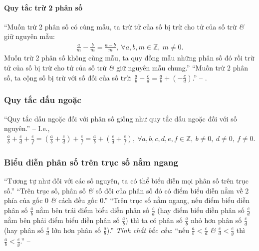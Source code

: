 \documentclass{article}
\numberwithin{equation}{section}
\begin{document}
\paragraph{Quy tắc trừ 2 phân số}
``Muốn trừ 2 phân số có cùng mẫu, ta trừ tử của số bị trừ cho tử của số trừ \textit{\&} giữ nguyên mẫu:
\begin{align*}
	\frac{a}{m} - \frac{b}{m} = \frac{a - b}{m},\ \forall a,b,m\in\mathbb{Z},\ m\ne 0.
\end{align*}
Muốn trừ 2 phân số không cùng mẫu, ta quy đồng mẫu những phân số đó rồi trừ tử của số bị trừ cho tử của số trừ \textit{\&} giữ nguyên mẫu chung.'' ``Muốn trừ 2 phân số, ta cộng số bị trừ với số đối của số trừ: $\frac{a}{b} - \frac{c}{d} = \frac{a}{b} + \left(-\frac{c}{d}\right)$.'' -- \cite[pp. 36--37]{SGK_Toan_6_Canh_Dieu_tap_2}.

\subsubsection{Quy tắc dấu ngoặc}
``Quy tắc dấu ngoặc đối với phân số giống như quy tắc dấu ngoặc đối với số nguyên.'' -- \cite[p. 37]{SGK_Toan_6_Canh_Dieu_tap_2} I.e.,
\begin{align*}
	\frac{a}{b} + \frac{c}{d} + \frac{e}{f} = \left(\frac{a}{b} + \frac{c}{d}\right) + \frac{e}{f} = \frac{a}{b} + \left(\frac{c}{d} + \frac{e}{f}\right),\ \forall a,b,c,d,e,f\in\mathbb{Z},\ b\ne 0,\ d\ne 0,\ f\ne 0.
\end{align*}

\subsubsection{Biểu diễn phân số trên trục số nằm ngang}
``Tương tự như đối với các số nguyên, ta có thể biểu diễn mọi phân số trên trục số.'' ``Trên trục số, phân số \textit{\&} số đối của phân số đó có điểm biểu diễn nằm về 2 phía của gốc 0 \textit{\&} cách đều gốc 0.'' ``Trên trục số nằm ngang, nếu điểm biểu diễn phân số $\frac{a}{b}$ nằm bên trái điểm biểu diễn phân số $\frac{c}{d}$ (hay điểm biểu diễn phân số $\frac{c}{d}$ nằm bên phải điểm biểu diễn phân số $\frac{a}{b}$) thì ta có phân số $\frac{a}{b}$ nhỏ hơn phân số $\frac{c}{d}$ (hay phân số $\frac{c}{d}$ lớn hơn phân số $\frac{a}{b}$).'' \textit{Tính chất bắc cầu}: ``nếu $\frac{a}{b} < \frac{c}{d}$ \textit{\&} $\frac{c}{d} < \frac{e}{g}$ thì $\frac{a}{b} < \frac{e}{g}$.'' -- \cite[p. 39]{SGK_Toan_6_Canh_Dieu_tap_2}

\end{document}
